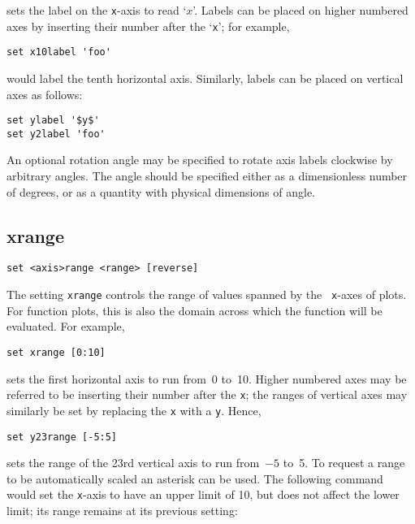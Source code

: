 \noindent sets the label on the {\tt x}-axis to read `$x$'.  Labels can be
placed on higher numbered axes by inserting their number after the `{\tt x}';
for example,

\begin{verbatim}
set x10label 'foo'
\end{verbatim}

\noindent would label the tenth horizontal axis. Similarly, labels can be
placed on vertical axes as follows:

\begin{verbatim}
set ylabel '$y$'
set y2label 'foo'
\end{verbatim}

An optional rotation angle may be specified to rotate axis labels clockwise by
arbitrary angles. The angle should be specified either as a dimensionless
number of degrees, or as a quantity with physical dimensions of angle.

\subsection{xrange}

\begin{verbatim}
set <axis>range <range> [reverse]
\end{verbatim}

The setting {\tt xrange} controls the range of values spanned by the {\tt
x}-axes of plots.  For function plots, this is also the domain across which the
function will be evaluated.  For example,

\begin{verbatim}
set xrange [0:10]
\end{verbatim}

\noindent sets the first horizontal axis to run from~0 to~10.  Higher numbered
axes may be referred to be inserting their number after the {\tt x}; the ranges
of vertical axes may similarly be set by replacing the {\tt x} with a {\tt y}.
Hence,

\begin{verbatim}
set y23range [-5:5]
\end{verbatim}

\noindent sets the range of the 23rd vertical axis to run from~$-5$ to~5.  To
request a range to be automatically scaled an asterisk can be used.  The
following command would set the {\tt x}-axis to have an upper limit of 10, but
does not affect the lower limit; its range remains at its previous setting:

